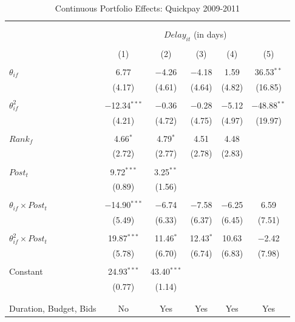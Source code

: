 \documentclass[
]{article}
\begin{document}
\begin{table}[H] \centering 
  \caption{Continuous Portfolio Effects: Quickpay 2009-2011} 
  \label{} 
\small 
\begin{tabular}{@{\extracolsep{-2pt}}lccccc} 
\\[-1.8ex]\hline 
\hline \\[-1.8ex] 
\\[-1.8ex] & \multicolumn{5}{c}{$Delay_{it}$ (in days)} \\ 
\\[-1.8ex] & (1) & (2) & (3) & (4) & (5)\\ 
\hline \\[-1.8ex] 
 $\theta_{if}$ & 6.77 & $-$4.26 & $-$4.18 & 1.59 & 36.53$^{**}$ \\ 
  & (4.17) & (4.61) & (4.64) & (4.82) & (16.85) \\ 
  & & & & & \\ 
 $\theta_{if}^2$ & $-$12.34$^{***}$ & $-$0.36 & $-$0.28 & $-$5.12 & $-$48.88$^{**}$ \\ 
  & (4.21) & (4.72) & (4.75) & (4.97) & (19.97) \\ 
  & & & & & \\ 
 $Rank_f$ & 4.66$^{*}$ & 4.79$^{*}$ & 4.51 & 4.48 &  \\ 
  & (2.72) & (2.77) & (2.78) & (2.83) &  \\ 
  & & & & & \\ 
 $Post_t$ & 9.72$^{***}$ & 3.25$^{**}$ &  &  &  \\ 
  & (0.89) & (1.56) &  &  &  \\ 
  & & & & & \\ 
 $\theta_{if} \times Post_t$ & $-$14.90$^{***}$ & $-$6.74 & $-$7.58 & $-$6.25 & 6.59 \\ 
  & (5.49) & (6.33) & (6.37) & (6.45) & (7.51) \\ 
  & & & & & \\ 
 $\theta_{if}^2 \times Post_t$ & 19.87$^{***}$ & 11.46$^{*}$ & 12.43$^{*}$ & 10.63 & $-$2.42 \\ 
  & (5.78) & (6.70) & (6.74) & (6.83) & (7.98) \\ 
  & & & & & \\ 
 Constant & 24.93$^{***}$ & 43.40$^{***}$ &  &  &  \\ 
  & (0.77) & (1.14) &  &  &  \\ 
  & & & & & \\ 
\hline \\[-1.8ex] 
Duration, Budget, Bids & No & Yes & Yes & Yes & Yes \\ 

\end{tabular}
\end{table}
\end{document}
